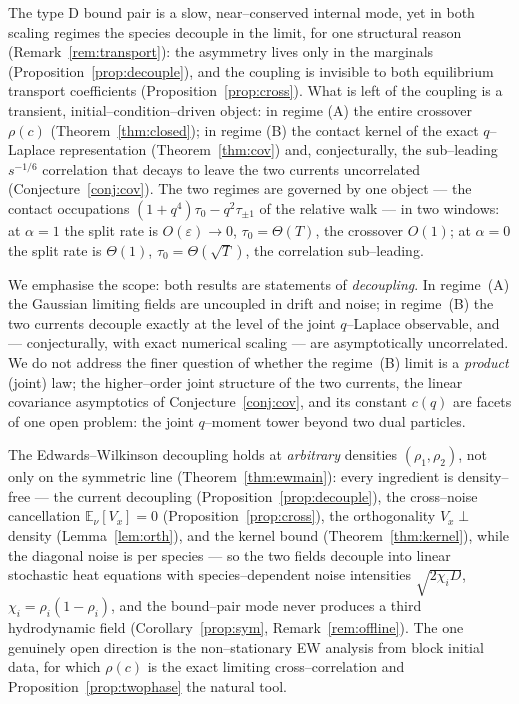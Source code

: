 \documentclass[11pt]{article}
\theoremstyle{plain}
\theoremstyle{definition}
\theoremstyle{remark}
\newcommand{\E}{\mathbb{E}}\newcommand{\PP}{\mathbb{P}}\newcommand{\dd}{\,\mathrm{d}}
\newcommand{\eps}{\varepsilon}\newcommand{\Exp}{\mathrm{Exp}}
\begin{document}
The type D bound pair is a slow, near--conserved internal mode, yet in both scaling
regimes the species decouple in the limit, for one structural reason
(Remark~\ref{rem:transport}): the asymmetry lives only in the marginals
(Proposition~\ref{prop:decouple}), and the coupling is invisible to both equilibrium
transport coefficients (Proposition~\ref{prop:cross}). What is left of the coupling is a
transient, initial--condition--driven object: in regime (A) the entire crossover
$\rho(c)$ (Theorem~\ref{thm:closed}); in regime (B) the contact kernel of the exact
$q$--Laplace representation (Theorem~\ref{thm:cov}) and, conjecturally, the
sub--leading $s^{-1/6}$ correlation that decays to leave the two currents
uncorrelated (Conjecture~\ref{conj:cov}).
The two regimes are governed by one object --- the contact occupations
$(1+q^4)\tau_0-q^2\tau_{\pm1}$ of the relative walk --- in two
windows: at $\alpha=1$ the split rate is
$O(\eps)\to0$, $\tau_0=\Theta(T)$, the crossover $O(1)$; at $\alpha=0$ the split rate
is $\Theta(1)$, $\tau_0=\Theta(\sqrt T)$, the correlation sub--leading.

We emphasise the scope: both results are statements of \emph{decoupling}. In regime~(A)
the Gaussian limiting fields are uncoupled in drift and noise; in regime~(B) the two
currents decouple exactly at the level of the joint $q$--Laplace observable, and ---
conjecturally, with exact numerical scaling --- are asymptotically uncorrelated. We
do not address the finer question of whether the regime~(B) limit is a \emph{product}
(joint) law; the higher--order joint structure of the two currents, the linear
covariance asymptotics of Conjecture~\ref{conj:cov}, and its constant $c(q)$ are
facets of one open problem: the joint $q$--moment tower beyond two dual particles.

The Edwards--Wilkinson decoupling holds at \emph{arbitrary} densities $(\rho_1,\rho_2)$,
not only on the symmetric line (Theorem~\ref{thm:ewmain}): every ingredient is
density--free --- the current decoupling (Proposition~\ref{prop:decouple}), the
cross--noise cancellation $\E_\nu[V_x]=0$ (Proposition~\ref{prop:cross}), the
orthogonality $V_x\perp$ density (Lemma~\ref{lem:orth}), and the kernel bound
(Theorem~\ref{thm:kernel}), while the diagonal noise is per species --- so the two
fields decouple into linear stochastic heat equations with species--dependent noise
intensities $\sqrt{2\chi_iD}$, $\chi_i=\rho_i(1-\rho_i)$, and the bound--pair mode never
produces a third hydrodynamic field (Corollary~\ref{prop:sym}, Remark~\ref{rem:offline}).
The one genuinely open direction is the non--stationary EW analysis from block initial
data, for which $\rho(c)$ is the exact limiting cross--correlation and
Proposition~\ref{prop:twophase} the natural tool.
\end{document}
